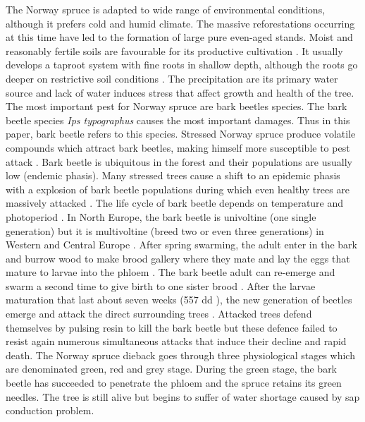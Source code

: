 \documentclass[3p,procedia]{elsarticle}
\begin{document}
The Norway spruce is adapted to wide range of environmental conditions, although it prefers cold and humid climate.
The massive reforestations occurring at this time have led to the formation of large pure even-aged stands.
Moist and reasonably fertile soils are favourable for its productive cultivation \citep{horgan_guide_2003}.
It usually develops a taproot system with fine roots in shallow depth, although the roots go deeper on restrictive soil conditions \citep{puhe_roots_2003}.   
The precipitation are its primary water source \citep{tjoelker_outline_2007} and lack of water induces stress that affect growth and health of the tree. 
The most important pest for Norway spruce are bark beetles species.
The bark beetle species \textit{Ips typographus} causes the most important damages.
Thus in this paper, bark beetle refers to this species.
Stressed Norway spruce produce volatile compounds which attract bark beetles, making himself more susceptible to pest attack \citep{netherer_waterlimiting_2015,netherer_interactions_2021}.
Bark beetle is ubiquitous in the forest and their populations are usually low (endemic phasis).
Many stressed trees  cause a shift to an epidemic phasis with a explosion of bark beetle populations during which even healthy trees are massively attacked \citep{kautz_individual_2014}.
The life cycle of bark beetle depends on temperature and photoperiod \citep{baier_phenipscomprehensive_2007,annila_influence_1969}.
In North Europe, the bark beetle is univoltine (one single generation) but it is multivoltine (breed two or even three generations) in Western and Central Europe \citep{annila_influence_1969}.
After spring swarming, the adult enter in the bark and burrow wood to make brood gallery where they mate and lay the eggs that mature to larvae into the phloem \citep{hlasny_bark_2021}.
The bark beetle adult can re-emerge and swarm a second time to give birth to one sister brood \citep{zolubas_1995}.
After the larvae maturation that last about seven weeks (557 dd \citep{baier_phenipscomprehensive_2007}), the new generation of beetles emerge and attack the direct surrounding trees \citep{zolubas_1995}.
Attacked trees defend themselves by pulsing resin to kill the bark beetle but these defence failed to resist again numerous simultaneous attacks that induce their decline and rapid death.
The Norway spruce dieback goes through three physiological stages which are denominated green, red and grey stage.
During the green stage, the bark beetle has succeeded to penetrate the phloem and the spruce retains its green needles. 
The tree is still alive but begins to suffer of water shortage caused by sap conduction problem. 
\end{document}
